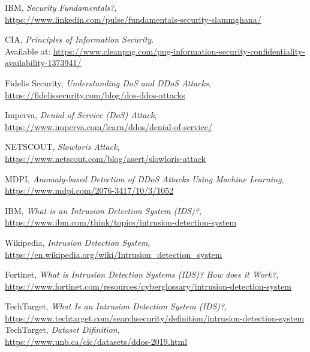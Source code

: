 \documentclass{report}
\begin{document}
\begin{thebibliography}{9}



IBM, \emph{Security Fundamentals?},\\
\url{https://www.linkedin.com/pulse/fundamentals-security-slammghana/}

CIA, \emph{Principles of Information Security}.\\
Available at: \url{https://www.cleanpng.com/png-information-security-confidentiality-availability-1373941/}


Fidelis Security, \emph{Understanding DoS and DDoS Attacks},\\
\url{https://fidelissecurity.com/blog/dos-ddos-attacks}

Imperva, \emph{Denial of Service (DoS) Attack},\\
\url{https://www.imperva.com/learn/ddos/denial-of-service/}

NETSCOUT, \emph{Slowloris Attack},\\
\url{https://www.netscout.com/blog/asert/slowloris-attack}

MDPI, \emph{Anomaly-based Detection of DDoS Attacks Using Machine Learning},\\
\url{https://www.mdpi.com/2076-3417/10/3/1052}

IBM, \emph{What is an Intrusion Detection System (IDS)?},\\
\url{https://www.ibm.com/think/topics/intrusion-detection-system}

Wikipedia, \emph{Intrusion Detection System},\\
\url{https://en.wikipedia.org/wiki/Intrusion_detection_system}

Fortinet, \emph{What is Intrusion Detection Systems (IDS)? How does it Work?},\\
\url{https://www.fortinet.com/resources/cyberglossary/intrusion-detection-system}

TechTarget, \emph{What Is an Intrusion Detection System (IDS)?},\\
\url{https://www.techtarget.com/searchsecurity/definition/intrusion-detection-system}
TechTarget, \emph{Dataset Difinition},\\
\url{https://www.unb.ca/cic/datasets/ddos-2019.html}



\end{thebibliography}
\end{document}
